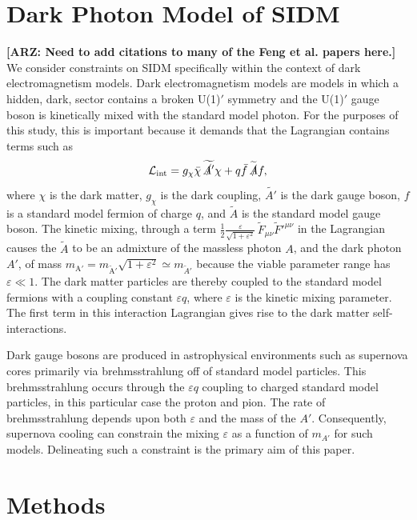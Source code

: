 \documentclass[nofootinbib,prd,superscriptaddress,twocolumn]{revtex4}
\newcommand{\arz}[1]{{{\bf{\color{BrickRed}[ARZ: #1]}}}}
\begin{document}
\section{Dark Photon Model of SIDM}
\label{section:model}

\arz{Need to add citations to many of the Feng et al. papers here.}
We consider constraints on SIDM specifically within the context of dark electromagnetism models. 
Dark electromagnetism models are models in which a hidden, dark, sector contains a broken U(1)$'$ 
symmetry and the U(1)$'$ gauge boson is kinetically mixed with the standard model photon. For the 
purposes of this study, this is important because it demands that the Lagrangian contains terms such as 
%
\begin{equation}
\mathcal{L}_{\mathrm{int}} = g_{\chi} \bar{\chi} \, \widetilde{\slashed{A'}} \chi + q \bar{f}\, \widetilde{\slashed{A}} f, 
\end{equation}
%
where $\chi$ is the dark matter, $g_{\chi}$ is the dark coupling, $\widetilde{A'}$ is the dark gauge boson, 
$f$ is a standard model fermion of charge $q$, and $\widetilde{A}$ is the standard model gauge boson. 
The kinetic mixing, through a term 
$\frac{1}{2}\frac{\varepsilon}{\sqrt{1+\varepsilon^2}}\, \widetilde{F}_{\mu \nu}\widetilde{F}'^{\mu \nu}$ 
in the Lagrangian causes the $\widetilde{A}$ to be an admixture of the massless photon $A$, 
and the dark photon $A'$, 
of mass $m_{\mathrm{A'}} = m_{\mathrm{\widetilde{A}'}} \sqrt{1 + \varepsilon^2} \simeq m_{\widetilde{A}'}$ because 
the viable parameter range has $\varepsilon \ll 1$. The dark matter particles are thereby coupled 
to the standard model fermions with a coupling constant $\varepsilon q$, 
where $\varepsilon$ is the kinetic mixing parameter. The first term in this 
interaction Lagrangian gives rise to the dark matter self-interactions. 

Dark gauge bosons are produced in astrophysical environments such as supernova 
cores primarily via brehmsstrahlung off of standard model particles. This brehmsstrahlung 
occurs through the $\varepsilon q$ coupling to charged standard model particles, 
in this  particular case the proton and pion. The rate of brehmsstrahlung 
depends upon both $\varepsilon$ and the mass of the $A'$. Consequently, 
supernova cooling can constrain the mixing $\varepsilon$ as a function of 
$m_{A'}$ for such models. Delineating such a constraint is the 
primary aim of this paper.


\section{Methods}
\label{section:computational}
	
\end{document}
